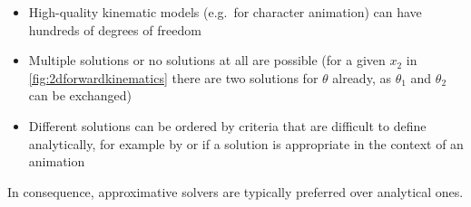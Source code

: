 \begin{itemize}
  \item High-quality kinematic models (e.g.\ for character animation) can have hundreds of degrees of freedom
  \item Multiple solutions or no solutions at all are possible
        (for a given \(x_2\) in \autoref{fig:2dforwardkinematics} there are two solutions for \(\theta\) already,
         as \(\theta_1\) and \(\theta_2\) can be exchanged)
  \item Different solutions can be ordered by criteria that are difficult to define analytically,
        for example by  or if a solution is appropriate in the context of an animation
\end{itemize}

In consequence, approximative solvers are typically preferred over analytical ones.
